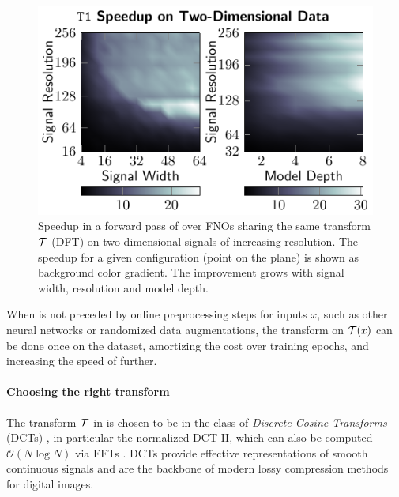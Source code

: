 \begin{figure}\label{clean_speedups}
    \centering
    \vspace{-3mm}
    \includegraphics[width=0.9\linewidth]{drawings/speedup_2d.pdf}
    \vspace{-5mm}
    \caption{\footnotesize Speedup in a forward pass of \ourmethod{} over FNOs sharing the same transform $\mathcal{T}$ (DFT) on two-dimensional signals of increasing resolution. The speedup for a given configuration (point on the plane) is shown as background color gradient. The improvement grows with signal width, resolution and model depth. }
    \label{fig:speedup-contour-2d}
\end{figure}

When \ourmethod{} is not preceded by online preprocessing steps for inputs $x$, such as other neural networks or randomized data augmentations, the transform on $\mathcal{T}(x)$ can be done once  on the dataset, amortizing the cost over training epochs, and increasing the speed of \ourmethod{} further.




\paragraph{Choosing the right transform}\label{par:choosing}

The transform $\mathcal{T}$ in \ourmethod{} is chosen to be in the class of \textit{Discrete Cosine Transforms} (DCTs) \citep{ahmed1974discrete,strang1999discrete}, in particular the normalized DCT-II, which can also be computed $\mathcal{O}(N \log N)$ via FFTs \citep{makhoul1980fast}. DCTs provide effective representations of smooth continuous signals \citep{trefethen2019approximation} and are the backbone of modern lossy compression methods for digital images.

